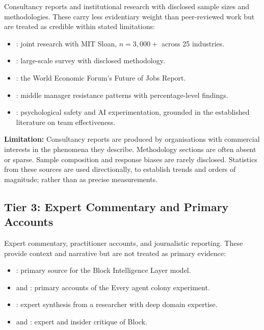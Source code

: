 Consultancy reports and institutional research with disclosed sample sizes and methodologies. These carry less evidentiary weight than peer-reviewed work but are treated as credible within stated limitations:

\begin{itemize}
  \item \textcite{BCGAIKPIs2025}: joint research with MIT Sloan, $n = 3{,}000+$ across 25 industries.
  \item \textcite{MicrosoftWorkTrend2024}: large-scale survey with disclosed methodology.
  \item \textcite{WEF2025}: the World Economic Forum's Future of Jobs Report.
  \item \textcite{Capgemini2025}: middle manager resistance patterns with percentage-level findings.
  \item \textcite{EdmondsonLei2025}: psychological safety and AI experimentation, grounded in the established literature on team effectiveness.
\end{itemize}

\textbf{Limitation:} Consultancy reports are produced by organisations with commercial interests in the phenomena they describe. Methodology sections are often absent or sparse. Sample composition and response biases are rarely disclosed. Statistics from these sources are used directionally, to establish trends and orders of magnitude; rather than as precise measurements.

\subsection{Tier 3: Expert Commentary and Primary Accounts}

Expert commentary, practitioner accounts, and journalistic reporting. These provide context and narrative but are not treated as primary evidence:

\begin{itemize}
  \item \textcite{DorseyBotha2026}: primary source for the Block Intelligence Layer model.
  \item \textcite{Shipper2026} and \textcite{Klaassen2025}: primary accounts of the Every agent colony experiment.
  \item \textcite{Mollick2025Management}: expert synthesis from a researcher with deep domain expertise.
  \item \textcite{Spicer2026} and \textcite{Zamost2026}: expert and insider critique of Block.
\end{itemize}

